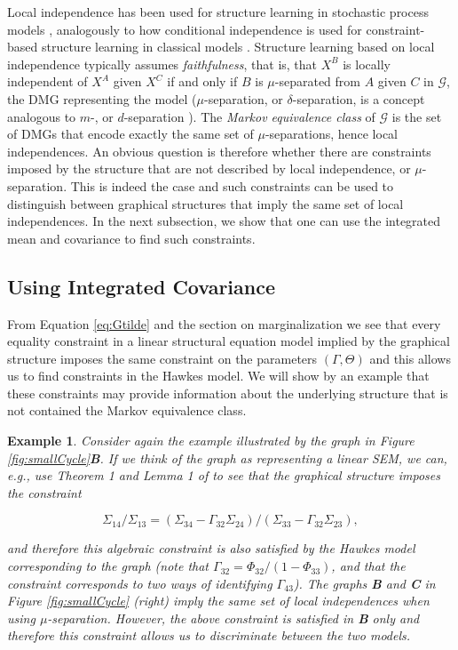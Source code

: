 \documentclass[accepted]{uai2021} %
\newtheorem{exmp}[thm]{Example}
\begin{document}
Local independence has been used for structure learning in stochastic process 
models 
\citep{meek2014, mogensenUAI2018, thams2019, mogensenUAI2020}, analogously to 
how conditional independence is used for 
constraint-based structure learning in classical models \citep{spirtes1993, 
spirtesSearchChapHandbook}. Structure learning based on local independence 
typically assumes 
\emph{faithfulness}, that is, that $X^B$ is locally independent of $X^A$ given 
$X^C$ if and only if $B$ is $\mu$-separated from $A$ given $C$ in 
$\mathcal{G}$, the DMG 
representing the model
($\mu$-separation, or $\delta$-separation, is a concept analogous to $m$-, or 
$d$-separation \citep{didelez2000, didelez2008, mogensen2018}). The 
\emph{Markov equivalence class} of $\mathcal{G}$ is the set of DMGs that encode 
exactly the same set of $\mu$-separations, 
hence local independences. An obvious 
question is therefore whether there are constraints imposed by the 
 structure that are not described by local independence, or $\mu$-separation. 
 This is indeed the 
 case 
 and such constraints can be used to distinguish between graphical structures 
 that imply the same set of local independences. In the next subsection, we 
 show that one can use the integrated mean and covariance to find such 
 constraints.


\subsection{Using Integrated Covariance}

From Equation \ref{eq:Gtilde} and the section on marginalization we see that 
every equality 
constraint in a linear structural equation model implied by the graphical 
structure imposes the same constraint
on the parameters $(\Gamma, \Theta)$ and this allows us to find 
constraints 
in the Hawkes model. We will show by an example that these constraints may 
provide information about the underlying structure that is not contained the 
Markov equivalence class.

\begin{exmp}
	\label{exmp:eqSmallCycle}
	Consider again the example illustrated by the graph in Figure 
	\ref{fig:smallCycle}\textbf{B}. If we think of the graph as representing a 
	linear SEM, we can, e.g., use Theorem 1 and Lemma 1 of \cite{chen2014} to 
	see that the graphical structure imposes the constraint 
	
	$$\Sigma_{14}/\Sigma_{13} = (\Sigma_{34} - 
	\Gamma_{32}\Sigma_{24})/(\Sigma_{33} - 
	\Gamma_{32}\Sigma_{23}),$$ 
	
	and 
	therefore this algebraic constraint is also satisfied by the Hawkes model 
	corresponding to the graph (note that $\Gamma_{32} = 
	\Phi_{32}/(1-\Phi_{33})$, and that the constraint 
	corresponds to
	two ways of identifying $\Gamma_{43}$). The graphs \textbf{B} and 
	\textbf{C} in Figure 
	\ref{fig:smallCycle} (right) 
	imply the same set of local independences
	when using $\mu$-separation. However, the above constraint is satisfied in 
	\textbf{B} only and therefore this constraint allows us to 
	discriminate between the two models.
\end{exmp}
\end{document}
